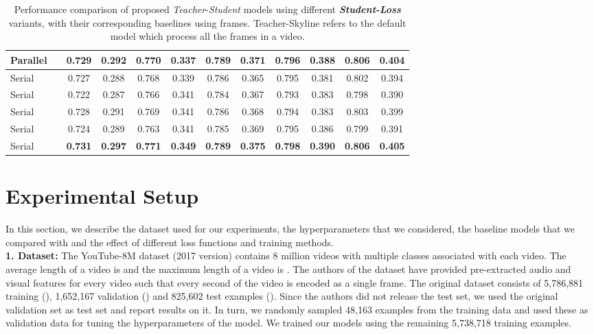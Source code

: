 \documentclass[10pt,twocolumn,letterpaper]{article}
\begin{document}
\begin{table*}[t]
{\begin{tabular}{|l|l|c|c|c|c|c|c|c|c|c|c|}
        Parallel &  & 0.729 & 0.292 & 0.770 & 0.337 & \textbf{0.789} & 0.371 & \multicolumn{1}{l|}{0.796} & 0.388 & \textbf{0.806} & 0.404 \\ \hline
        Serial &  & 0.727 & 0.288 & 0.768 & 0.339 & 0.786 & 0.365 & 0.795 & 0.381 & 0.802 & 0.394 \\
        Serial &  & 0.722 & 0.287 &  0.766 & 0.341 &  0.784 &  0.367 &  0.793 &  0.383&  0.798 & 0.390\\        
        Serial &  & 0.728 & 0.291 & 0.769 & 0.341 & 0.786 & 0.368 & 0.794 & 0.383 & 0.803 & 0.399 \\ 
        Serial &  &  0.724 & 0.289 & 0.763 & 0.341 & 0.785 & 0.369 & 0.795 & 0.386 & 0.799 & 0.391 \\     
        Serial &  & \textbf{0.731} & \textbf{0.297} & \textbf{0.771} & \textbf{0.349} & \textbf{0.789} & \textbf{0.375} & \textbf{0.798} & \textbf{0.390} &\textbf{ 0.806} & \textbf{0.405} \\ \hline
\end{tabular}
}
\caption{Performance comparison of proposed \textit{Teacher}-\textit{Student} models using different \textit{\textbf{Student-Loss}} variants, with their corresponding baselines using  frames. Teacher-Skyline refers to the default model which process all the frames in a video.}
\label{tab-perform}
\end{table*}

\section{Experimental Setup}
In this section, we describe the dataset used for our experiments, the hyperparameters that we considered, the baseline models that we compared with and the effect of different loss functions and training methods.\\

\noindent \textbf{1. Dataset:}
The YouTube-8M dataset (2017 version) \cite{Youtube8m} contains 8
million videos with multiple classes associated with each video. The average length of a video is  and the maximum length of a video is . The authors of the dataset have provided pre-extracted audio and visual features for every video such that every second of the video is encoded as a single frame. The original dataset consists of 5,786,881 training (), 1,652,167 validation () and 825,602 test examples (). Since the authors did not release the test set, we used the original validation set as test set and report results on it. In turn, we randomly sampled 48,163 examples from the training data and used these as validation data for tuning the hyperparameters of the model. We trained our models using the remaining 5,738,718 training examples.
\end{document}
